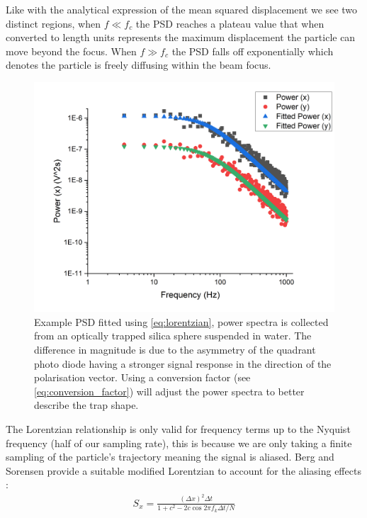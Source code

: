 Like with the analytical expression of the mean squared displacement we 
see two distinct regions, when $f\ll f_c$ the PSD reaches a plateau value 
that when converted to length units represents the maximum displacement 
the particle can move beyond the focus. When $f\gg f_c$ the PSD falls 
off exponentially which denotes the particle is freely diffusing within 
the beam focus.
\begin{figure}[h!]
	\centering
	\includegraphics[width=\linewidth]{PSD.png}
	\caption{Example PSD fitted using \eqref{eq:lorentzian}, power 
		spectra is collected from an optically trapped silica sphere 
		suspended in water. The difference in magnitude is due to 
		the asymmetry of the quadrant photo diode having a stronger 
		signal response in the direction of the polarisation vector. 
		Using a conversion factor (see \eqref{eq:conversion_factor}) 
		will adjust the power spectra to better describe the trap shape.}
\end{figure}

The Lorentzian relationship is only valid for frequency terms up to 
the Nyquist frequency (half of our sampling rate), this is because we 
are only taking a finite sampling of the particle's trajectory meaning 
the signal is aliased. Berg and Sorensen provide a suitable modified 
Lorentzian to account for the aliasing effects \cite{BergSoerensen2004}:
\begin{align}
	\label{eq:alaised_lorentzian}
	S_x = \frac{(\Delta x)^2\Delta t}{1+c^2-2c\cos{2\pi f_k\Delta t/N}}
\end{align}

